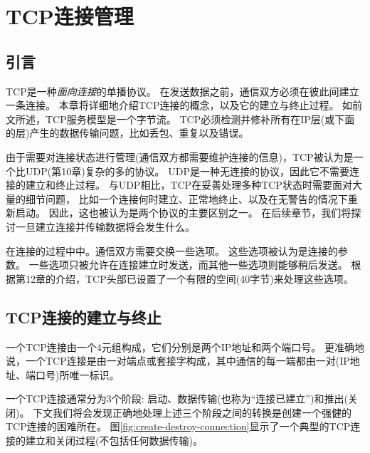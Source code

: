 \documentclass{../main.tex}{subfiles}
\begin{document}
\chapter{TCP连接管理}
\section{引言}
TCP是一种\emph{面向连接}的单播协议。
在发送数据之前，通信双方必须在彼此间建立一条连接。
本章将详细地介绍TCP连接的概念，以及它的建立与终止过程。
如前文所述，TCP服务模型是一个字节流。
TCP必须检测并修补所有在IP层(或下面的层)产生的数据传输问题，比如丢包、重复以及错误。

由于需要对连接状态进行管理(通信双方都需要维护连接的信息)，TCP被认为是一个比UDP(第10章)复杂的多的协议。
UDP是一种无连接的协议，因此它不需要连接的建立和终止过程。
与UDP相比，TCP在妥善处理多种TCP状态时需要面对大量的细节问题，
    比如一个连接何时建立、正常地终止、以及在无警告的情况下重新启动。
因此，这也被认为是两个协议的主要区别之一。
在后续章节，我们将探讨一旦建立连接并传输数据将会发生什么。

在连接的过程中中。通信双方需要交换一些选项。
这些选项被认为是连接的参数。
一些选项只被允许在连接建立时发送，而其他一些选项则能够稍后发送。
根据第12章的介绍，TCP头部已设置了一个有限的空间(40字节)来处理这些选项。


\section{TCP连接的建立与终止}
一个TCP连接由一个4元组构成，它们分别是两个IP地址和两个端口号。
更准确地说，一个TCP连接是由一对端点或套接字构成，其中通信的每一端都由一对(IP地址、端口号)所唯一标识。

一个TCP连接通常分为3个阶段: 启动、数据传输(也称为``连接已建立'')和推出(关闭)。
下文我们将会发现正确地处理上述三个阶段之间的转换是创建一个强健的TCP连接的困难所在。
图\ref{fig:create-destroy-connection}显示了一个典型的TCP连接的建立和关闭过程(不包括任何数据传输)。
\end{document}
